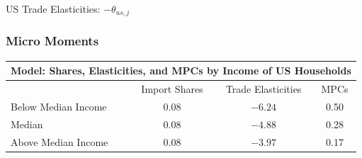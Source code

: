 \documentclass[9pt,pdftex,aspectratio=1610]{beamer}
\theoremstyle{definition}
\begin{document}

\begin{frame}[t]{US Trade Elasticities: $-\theta_{us,j}$}
\begin{figure}[!t]
\end{figure}
\end{frame}

\begin{frame}[t]
\frametitle{Micro Moments}
\begin{table}[t]
\small
\begin{center}
\setlength {\tabcolsep}{5.5mm}
\renewcommand{\arraystretch}{1.60}\label{tb-micro-shares}
\begin{tabular}[t]{l c c c}
\multicolumn{4}{c}{{\normalsize\textbf{Model: Shares, Elasticities, and MPCs by Income of US Households}} }
\\\hline \hline
& Import Shares & Trade Elasticities & MPCs\\
\cmidrule(lr){2-2} \cmidrule(lr){3-3} \cmidrule(lr){4-4}
Below Median Income & $0.08$ & $-6.24$ & 0.50\\
Median   & $0.08$ & $-4.88$ & 0.28\\
Above Median Income & $0.08$ & $-3.97$ & 0.17\\
\hline
\end{tabular}
\\[0.5ex]
\end{center}
\end{table}
\end{frame}
\end{document}
